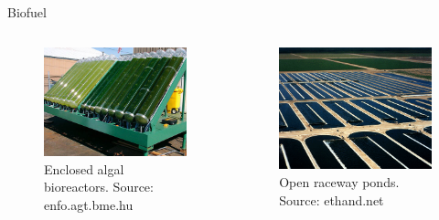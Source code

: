 \documentclass[8pt]{beamer}\usepackage[]{graphicx}\usepackage[]{color}
\begin{document}
\begin{frame}{Biofuel}
\begin{columns}
\begin{figure}
                                \includegraphics[width=1\textwidth]{./figure/algae-bioreactor_enfo_agt_bme_hu}
                                \caption{Enclosed algal bioreactors. Source: enfo.agt.bme.hu}
                        \end{figure}
                        \begin{figure}
                                \includegraphics[width=1\textwidth]{./figure/earthrise_farm_pond_ethand_net}
                                \caption{Open raceway ponds. Source: ethand.net}
                        \end{figure}
        \end{columns}
\end{frame}
\end{document}
